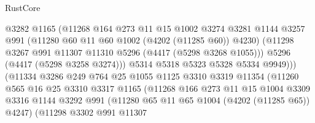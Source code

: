 \begin{lexlean}{RustCore}
\begin{coremodule}
                                  @3282
                                  @1165
                                  (@11268
                                    @164
                                    @273
                                    @11
                                    @15
                                    @1002
                                    @3274
                                    @3281
                                    @1144
                                    @3257
                                    @991
                                    (@11280 @60 @11 @60 @1002 (@4202 (@11285 @60)) @4230)
                                    (@11298
                                      @3267
                                      @991
                                      @11307
                                      @11310
                                      @5296
                                      (@4417 (@5298 @3268 @1055)))
                                    @5296
                                    (@4417 (@5298 @3258 @3274)))
                                  @5314
                                  @5318
                                  @5323
                                  @5328
                                  @5334
                                  @9949)))
                            (@11334
                              @3286
                              @249
                              @764
                              @25
                              @1055
                              @1125
                              @3310
                              @3319
                              @11354
                              (@11260
                                @565
                                @16
                                @25
                                @3310
                                @3317
                                @1165
                                (@11268
                                  @166
                                  @273
                                  @11
                                  @15
                                  @1004
                                  @3309
                                  @3316
                                  @1144
                                  @3292
                                  @991
                                  (@11280 @65 @11 @65 @1004 (@4202 (@11285 @65)) @4247)
                                  (@11298
                                    @3302
                                    @991
                                    @11307

\end{coremodule}
\end{lexlean}
